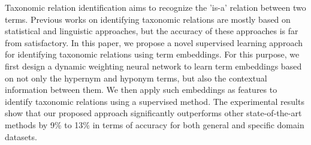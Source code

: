Taxonomic relation identification aims to recognize the 'is-a' relation between two terms. Previous works on identifying taxonomic relations are mostly based on statistical and linguistic approaches, but the accuracy of these approaches is far from satisfactory. In this paper, we propose a novel supervised learning approach for identifying taxonomic relations  using term embeddings. For this purpose, we first design a dynamic weighting neural network to learn term embeddings based on not only the hypernym and hyponym terms, but also the contextual information between them. We then apply such embeddings as features to identify taxonomic relations using a supervised method. The experimental results show that our proposed approach significantly outperforms other state-of-the-art methods by 9\% to 13\% in terms of accuracy for both general and specific domain datasets.
